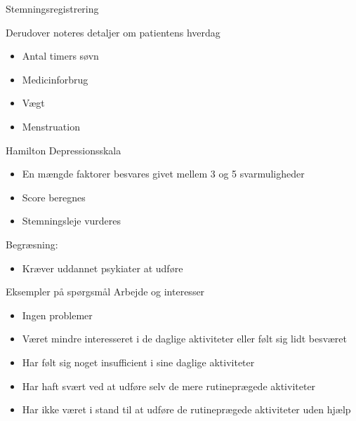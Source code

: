 { %
	\begin{frame}{Stemningsregistrering} %
		
		Derudover noteres detaljer om patientens hverdag
		\begin{itemize}
			\item Antal timers søvn
			\item Medicinforbrug
			\item Vægt
			\item Menstruation
		\end{itemize}
	\end{frame}}
	
{ %
\begin{frame}{Hamilton Depressionsskala} %
	\begin{itemize}
		\item En mængde faktorer besvares givet mellem 3 og 5 svarmuligheder
		\item Score beregnes
		\item Stemningsleje vurderes
	\end{itemize}
	
	Begræsning:
	\begin{itemize}
		\item Kræver uddannet psykiater at udføre
	\end{itemize}
	
\end{frame}}
	
{ %
	\begin{frame}{Eksempler på spørgsmål} %
		 Arbejde og interesser
		\begin{itemize}
			\item Ingen problemer
			\item Været mindre interesseret i de daglige aktiviteter eller følt sig lidt besværet
			\item Har følt sig noget insufficient i sine daglige aktiviteter
			\item Har haft svært ved at udføre selv de mere rutineprægede aktiviteter
			\item Har ikke været i stand til at udføre de rutineprægede aktiviteter uden hjælp
		\end{itemize}
		
	\end{frame}}

